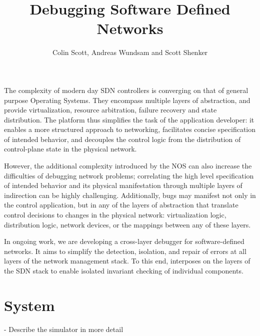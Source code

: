 \documentclass{sig-alternate-10pt}
\title{Debugging Software Defined Networks\vspace{-25pt}}
\author{Colin Scott, Andreas Wundsam and Scott Shenker}\vspace{-15pt}}
\date{}
\begin{document}
    \maketitle
    \thispagestyle{empty}
%
%
%
%  

The complexity of modern day SDN controllers is converging on that of general
purpose Operating Systems. They encompass multiple layers of abstraction, and
provide virtualization, resource arbitration, failure recovery and state
distribution. The platform thus simplifies the task of the application
developer: it enables a more structured approach to networking, facilitates
concise specification of intended behavior, and decouples the control logic from
the distribution of control-plane state in the physical network. 

However, the additional complexity introduced by the NOS can also increase the
difficulties of debugging network problems; correlating the high level
specification of intended behavior and its physical manifestation through
multiple layers of indirection can be highly challenging. Additionally, bugs may
manifest not only in the control application, but in any of the layers of
abstraction that translate control decisions to changes in the physical network:
virtualization logic, distribution logic, network devices, or the mappings
between any of these layers.

In ongoing work, we are developing a cross-layer debugger for software-defined
networks. It aims to simplify the detection, isolation, and repair of errors at
all layers of the network management stack. To this end, \projectname{}
interposes on the layers of the SDN stack to enable isolated invariant checking
of individual components.

\section{System}
- Describe the simulator in more detail
\end{document}
